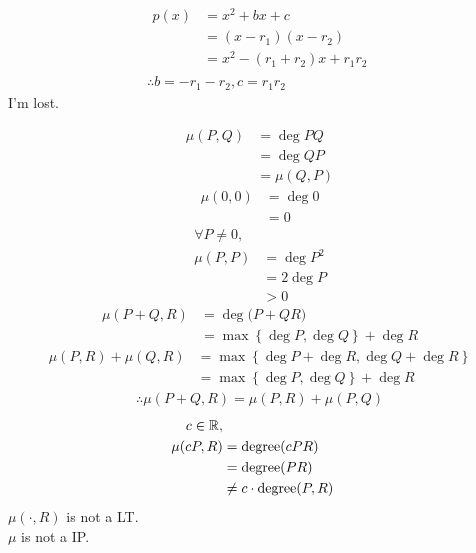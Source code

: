 \documentclass{mathtoolkit}
\begin{document}
\begin{p}
  \item
    \begin{gather*}
      \begin{aligned}
        p(x) & = x^2 + bx +c \\
             & = (x - r_1) (x - r_2) \\
             & = x^2 - (r_1 + r_2) x + r_1 r_2
      \end{aligned} \\
      \therefore b = - r_1 - r_2, c = r_1 r_2
    \end{gather*}
    I'm lost.

  \item
    \begin{align*}
      \mu(P, Q) & = \deg{PQ} \\
                & = \deg{QP} \\
                & = \mu(Q, P)
    \end{align*}
    \begin{align*}
      \mu(0, 0) & = \deg{0} \\
                & = 0
    \end{align*}
    \begin{align*}
      \forall P \ne 0, \\
      \mu(P, P) & = \deg{P^2} \\
                & = 2 \deg{P} \\
                & > 0
    \end{align*}
    \begin{align*}
      \mu(P + Q, R) & = \deg{(P + Q} R) \\
                    & = \max \left\{ \deg{P}, \deg{Q} \right\} + \deg{R}
    \end{align*}
    \begin{align*}
      \mu(P, R) + \mu(Q, R) & = \max \left\{ \deg{P} + \deg{R}, \deg{Q} + \deg{R} \right\} \\
                            & = \max \left\{ \deg{P}, \deg{Q} \right\} + \deg{R}
    \end{align*}
    \begin{gather*}
      \therefore \mu(P + Q, R) = \mu(P, R) + \mu(P, Q)
    \end{gather*}
    \begin{align*}
      c \in \mathbb{R}, \\
      \mu(cP, R) & = \mathrm{degree}(cPR) \\
                 & = \mathrm{degree}(PR) \\
                 & \ne c \cdot \mathrm{degree}(P, R)
    \end{align*}
    \therefore $\mu(\cdot, R)$ is not a LT. \\
    \therefore $\mu$ is not a IP.


\end{p}
\end{document}
